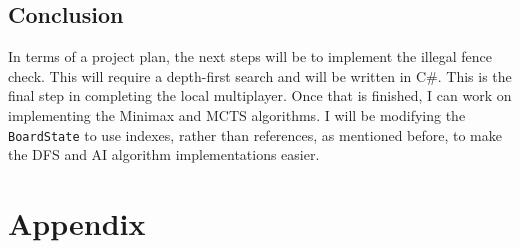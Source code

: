 \documentclass[progress]{cmpreport}
\begin{document}
\subsection{Conclusion}
In terms of a project plan, the next steps will be to implement the illegal fence check. This will require a depth-first search and will be written in C\#. This is the final step in completing the local multiplayer. Once that is finished, I can work on implementing the Minimax and MCTS algorithms. I will be modifying the \texttt{BoardState} to use indexes, rather than references, as mentioned before, to make the DFS and AI algorithm implementations easier.

\newpage
\appendix
\section{Appendix}
\end{document}
